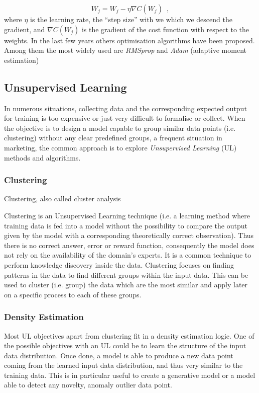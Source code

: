 \begin{equation}
    W_j = W_j - \eta\nabla C(W_j)
    \enspace,
\end{equation}
where $\eta$ is the learning rate, the “step size” with we which we descend the gradient, and $\nabla C(W_j)$ is the gradient of the cost function with respect to the weights.
In the last few years others optimisation algorithms have been proposed. Among them the most widely used are \textit{RMSprop} and \textit{Adam} (adaptive moment estimation) \citep{kingma2014adam}

\subsection{Unsupervised Learning}

In numerous situations, collecting data and the corresponding expected output for training is too expensive or just very difficult to formalise or collect. When the objective is to design a model capable to group similar data points (i.e. clustering) without any clear predefined groups, a frequent situation in marketing, the common approach is to explore \textit{Unsupervised Learning} (UL) methods and algorithms.

\subsubsection{Clustering}

Clustering, also called cluster analysis

Clustering is an Unsupervised Learning technique (i.e. a learning method where training data is fed into a model without the possibility to compare the output given by the model with a corresponding theoretically correct observation). Thus there is no correct answer, error or reward function, consequently the model does not rely on the availability of the domain’s experts. It is a common technique to perform knowledge discovery inside the data. Clustering focuses on
finding patterns in the data to find different groups within the input data. This can be used to cluster (i.e. group) the data which are the most similar and apply later on a specific process to each of these groups.

\subsubsection{Density Estimation}

Most UL objectives apart from clustering fit in a density estimation logic. One of the possible objectives with an UL could be to learn the structure of the input data distribution. Once done, a model is able to produce a new data point coming from the learned input data distribution, and thus very similar to the training data. This is in particular useful to create a generative model or a model able to detect any novelty, anomaly outlier data point.

